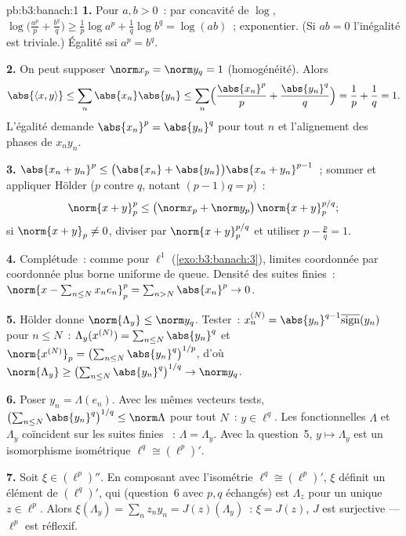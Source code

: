 \begin{solution}{pb:b3:banach:1}
\textbf{1.} Pour $a, b > 0$~: par concavité de $\log$,
$\log\bigl(\tfrac{a^p}p + \tfrac{b^q}q\bigr) \geq
\tfrac1p\log a^p + \tfrac1q\log b^q = \log(ab)$~;
exponentier. (Si $ab = 0$ l'inégalité est triviale.) Égalité
ssi $a^p = b^q$.

\textbf{2.} On peut supposer $\norm x_p = \norm y_q = 1$
(homogénéité). Alors
\[
\abs{\langle x, y\rangle} \leq \sum_n\abs{x_n}\abs{y_n}
\leq \sum_n\Bigl(\frac{\abs{x_n}^p}p +
\frac{\abs{y_n}^q}q\Bigr) = \frac1p + \frac1q = 1.
\]
L'égalité demande $\abs{x_n}^p = \abs{y_n}^q$ pour tout $n$ et
l'alignement des phases de $x_ny_n$.

\textbf{3.} $\abs{x_n + y_n}^p \leq \bigl(\abs{x_n} +
\abs{y_n}\bigr)\abs{x_n + y_n}^{p-1}$~; sommer et appliquer
Hölder ($p$ contre $q$, notant $(p - 1)q = p$)~:
\[
\norm{x + y}_p^p \leq \bigl(\norm x_p + \norm
y_p\bigr)\,\norm{x+y}_p^{p/q};
\]
si $\norm{x + y}_p \neq 0$, diviser par $\norm{x+y}_p^{p/q}$
et utiliser $p - \frac pq = 1$.

\textbf{4.} Complétude~: comme pour $\ell^1$
(\cref{exo:b3:banach:3}), limites coordonnée par coordonnée
plus borne uniforme de queue. Densité des suites finies~:
$\norm{x - \sum_{n\leq N}x_ne_n}_p^p = \sum_{n >
N}\abs{x_n}^p \to 0$.

\textbf{5.} Hölder donne $\norm{\Lambda_y} \leq \norm y_q$.
Tester~: $x^{(N)}_n =
\abs{y_n}^{q-1}\overline{\operatorname{sign}}(y_n)$ pour $n
\leq N$~: $\Lambda_y(x^{(N)}) = \sum_{n\leq N}\abs{y_n}^q$ et
$\norm{x^{(N)}}_p = \bigl(\sum_{n\leq
N}\abs{y_n}^{q}\bigr)^{1/p}$, d'où $\norm{\Lambda_y} \geq
\bigl(\sum_{n\leq N}\abs{y_n}^q\bigr)^{1/q} \to \norm y_q$.

\textbf{6.} Poser $y_n = \Lambda(e_n)$. Avec les mêmes
vecteurs tests, $\bigl(\sum_{n\leq N}\abs{y_n}^q\bigr)^{1/q}
\leq \norm\Lambda$ pour tout $N$~: $y \in \ell^q$. Les
fonctionnelles $\Lambda$ et $\Lambda_y$ coïncident sur les
suites finies ~: $\Lambda = \Lambda_y$. Avec la
question~5, $y \mapsto \Lambda_y$ est un isomorphisme
isométrique $\ell^q \cong (\ell^p)'$.

\textbf{7.} Soit $\xi \in (\ell^p)''$. En composant avec
l'isométrie $\ell^q \cong (\ell^p)'$, $\xi$ définit un
élément de $(\ell^q)'$, qui (question~6 avec $p, q$
échangés) est $\Lambda_z$ pour un unique $z \in \ell^p$.
Alors $\xi(\Lambda_y) = \sum_nz_ny_n = J(z)(\Lambda_y)$~:
$\xi = J(z)$, $J$ est surjective --- $\ell^p$ est réflexif.


\end{solution}
